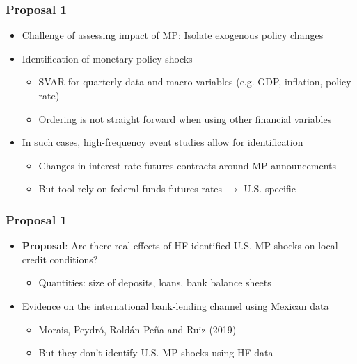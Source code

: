 \documentclass[12pt, aspectratio=169, xcolor=dvipsnames]{beamer} 			         %
\begin{document}
\begin{frame}
	\frametitle{Proposal 1}
	\begin{itemize}
		\item Challenge of assessing impact of MP: Isolate exogenous policy changes
		\item Identification of monetary policy shocks
		\begin{itemize}
			\item SVAR for quarterly data and macro variables (e.g. GDP, inflation, policy rate)
			\item Ordering is not straight forward when using other financial variables
		\end{itemize}
		\item In such cases, high-frequency event studies allow for identification
		\begin{itemize}
			\item Changes in interest rate futures contracts around MP announcements
			\item But tool rely on federal funds futures rates $\rightarrow$ U.S. specific
		\end{itemize}
	\end{itemize}
\end{frame}

\begin{frame}
	\frametitle{Proposal 1}
	\begin{itemize}
	\item \textbf{Proposal}: Are there real effects of HF-identified U.S. MP shocks on local credit conditions?
	\begin{itemize}
		\item Quantities: size of deposits, loans, bank balance sheets
	\end{itemize}
	\item Evidence on the international bank-lending channel using Mexican data
	\begin{itemize}
		\item Morais, Peydró, Roldán-Peña and Ruiz (2019)
		\item But they don't identify U.S. MP shocks using HF data
	\end{itemize}
	\end{itemize}
\end{frame}
\end{document}
